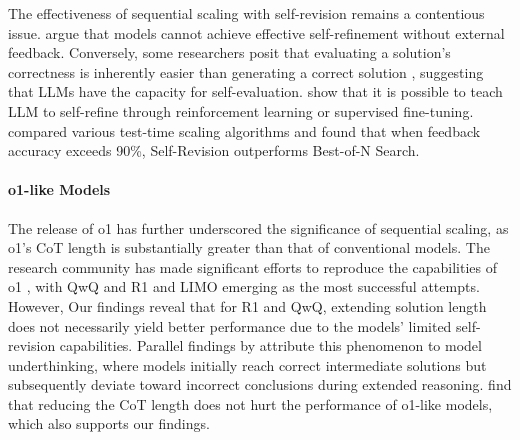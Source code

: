 The effectiveness of sequential scaling with self-revision remains a contentious issue. \citet{LLM_cannot_self_correct,can-llm-self-revision} argue that models cannot achieve effective self-refinement without external feedback. Conversely, some researchers posit that evaluating a solution’s correctness is inherently easier than generating a correct solution \citep{janleike2022why_excited_about_AI_assisted_human_feedback}, suggesting that LLMs have the capacity for self-evaluation. \citet{SCoRE,teach-self-revision} show that it is possible to teach LLM to self-refine through reinforcement learning or supervised fine-tuning. \citet{Tree_search_vs_revisions} compared various test-time scaling algorithms and found that when feedback accuracy exceeds 90\%, Self-Revision outperforms Best-of-N Search.

\paragraph{o1-like Models} The release of o1 \citep{o1_blog,o1_system_card} has further underscored the significance of sequential scaling, as o1’s CoT length is substantially greater than that of conventional models. The research community has made significant efforts to reproduce the capabilities of o1 \citep{o1-journey1,o1-journey2,renda-1,renda-2,s1}, with QwQ \citep{qwq} and R1 \citep{deepseek-r1} and LIMO \citep{ye2025limoreasoning} emerging as the most successful attempts. However, Our findings reveal that for R1 and QwQ, extending solution length does not necessarily yield better performance due to the models’ limited self-revision capabilities. Parallel findings by \citet{o1-underthink} attribute this phenomenon to model underthinking, where models initially reach correct intermediate solutions but subsequently deviate toward incorrect conclusions during extended reasoning. \citet{o1-overthink,o1-pruner,o1-efficient} find that reducing the CoT length does not hurt the performance of o1-like models, which also supports our findings.


